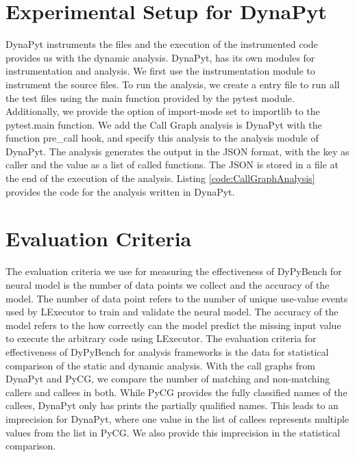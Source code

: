 \section{Experimental Setup for DynaPyt}
DynaPyt instruments the files and the execution of the instrumented code provides us with the dynamic analysis.
DynaPyt, has its own modules for instrumentation and analysis.
We first use the instrumentation module to instrument the source files.
To run the analysis, we create a entry file to run all the test files using the main function provided by the pytest module.
Additionally, we provide the option of import-mode set to importlib to the pytest.main function.
We add the Call Graph analysis is DynaPyt with the function pre\_call hook, and specify this analysis to the analysis module of DynaPyt.
The analysis generates the output in the JSON format, with the key as caller and the value as a list of called functions.
The JSON is stored in a file at the end of the execution of the analysis.
Listing \ref{code:CallGraphAnalysis} provides the code for the analysis written in DynaPyt.

\section{Evaluation Criteria}
The evaluation criteria we use for measuring the effectiveness of DyPyBench for neural model is the number of data points we collect and the accuracy of the model.
The number of data point refers to the number of unique use-value events used by LExecutor to train and validate the neural model.
The accuracy of the model refers to the how correctly can the model predict the missing input value to execute the arbitrary code using LExecutor. 
The evaluation criteria for effectiveness of DyPyBench for analysis frameworks is the data for statistical comparison of the static and dynamic analysis.
With the call graphs from DynaPyt and PyCG, we compare the number of matching and non-matching callers and callees in both.
While PyCG provides the fully classified names of the callees, DynaPyt only has prints the partially qualified names.
This leads to an imprecision for DynaPyt, where one value in the list of callees represents multiple values from the list in PyCG.
We also provide this imprecision in the statistical comparison.
